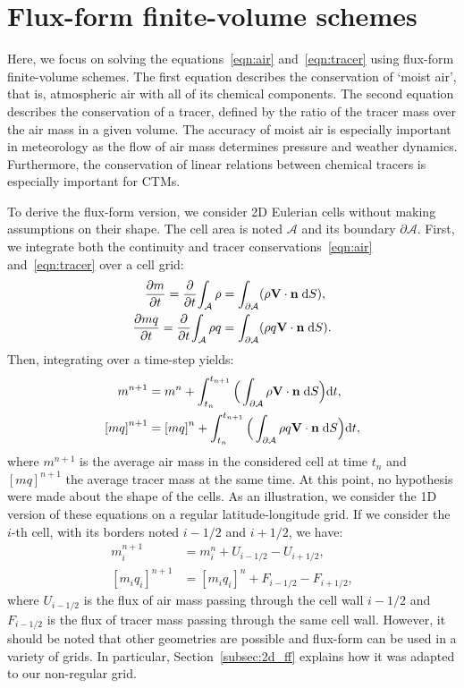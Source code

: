 \section{Flux-form finite-volume schemes}
\label{sec:fv_schemes}
Here, we focus on solving the equations~\eqref{eqn:air} and~\eqref{eqn:tracer}
using flux-form finite-volume schemes. The first equation describes the
conservation of `moist air', that is, atmospheric air with all of its chemical
components. The second equation describes the conservation of a tracer, defined
by the ratio of the tracer mass over the air mass in a given volume. The
accuracy of moist air is especially important in meteorology as the flow of air
mass determines pressure and weather dynamics. Furthermore, the conservation of
linear relations between chemical tracers is especially important for
\gls{CTM}s.

To derive the flux-form version, we consider 2D Eulerian cells without making
assumptions on their shape. The cell area is noted $\mathcal{A}$ and its
boundary $\partial \mathcal{A}$. First, we integrate both the continuity and
tracer conservations~\eqref{eqn:air} and~\eqref{eqn:tracer} over a cell grid:
\begin{align}
  \frac{\partial m}{\partial t}=\frac{\partial}{\partial t} {\int_{\mathcal{A}}
\rho}
&= \int_{\partial \mathcal{A}} (\rho {\bf V}\cdot{\bf n} \;\mathrm{d}S),
\label{eqn:air2}\\
\frac{\partial mq}{\partial t}=\frac{\partial}{\partial t} {\int_{\mathcal{A}}
\rho q} &= \int_{\partial \mathcal{A}} (\rho q {\bf V}\cdot {\bf n} \;\mathrm{d}S).
\label{eqn:tracer2}
\end{align}
Then, integrating over a time-step yields:
\begin{align}
m^{n+1} &= m^{n} + \int_{t_n}^{t_{n+1}}
\Big( \int_{\partial \mathcal{A}} \rho {\bf V}\cdot{\bf n}\;\mathrm{d}S \Big) \mathrm{d}t,
\label{eqn:mintegral} \\
{[mq]}^{n+1} &= {[mq]}^{n} + \int_{t_n}^{t_{n+1}}
\Big( \int_{\partial \mathcal{A}} \rho q {\bf V}\cdot{\bf n}\;\mathrm{d}S \Big) \mathrm{d}t,
\label{eqn:qintegral}
   \end{align}
where $m^{n+1}$ is the average air mass in the considered cell at time $t_n$
and ${[mq]}^{n+1}$ the average tracer mass at the same time.
At this point, no hypothesis were made about the shape of the cells.
As an illustration, we consider the 1D version of these equations on a regular
latitude-longitude grid. If we consider the $i$-th cell, with its borders noted
$i-1/2$ and $i+1/2$, we have:
\begin{align}
\label{eqn:air_update}
  {m}_i^{n+1} &= m_i^{n} + U_{i-1/2} - U_{i+1/2},\\
\label{eqn:tracer_update}
  {[m_i q_i]}^{n+1} &= {[m_i q_i]}^{n} + F_{i-1/2} - F_{i+1/2},
\end{align}
where $U_{i-1/2}$ is the flux of air mass passing through the cell wall $i-1/2$ and
$F_{i-1/2}$ is the flux of tracer mass passing through the same cell wall.
However, it should be noted that other geometries are possible and flux-form can
be used in a variety of grids. In particular, Section~\ref{subsec:2d_ff} explains how it was
adapted to our non-regular grid.

